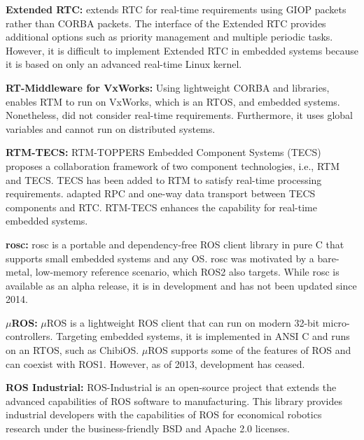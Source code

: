 \documentclass{sig-alternate-05-2015}
\begin{document}
\textbf{Extended RTC:} 
\cite{chishiro2009extended} extends RTC for real-time requirements using GIOP packets rather than CORBA packets.
The interface of the Extended RTC provides additional options such as priority management and multiple periodic tasks. 
However, it is difficult to implement Extended RTC in embedded systems because it is based on only an advanced real-time Linux kernel.

\textbf{RT-Middleware for VxWorks:} 
Using lightweight CORBA and libraries, \cite{ikezoeopenrt} enables RTM to run on VxWorks, which is an RTOS, and embedded systems.
Nonetheless,  \cite{ikezoeopenrt} did not consider real-time requirements. 
Furthermore, it uses global variables and cannot run on distributed systems.

\textbf{RTM-TECS:} RTM-TOPPERS Embedded Component Systems (TECS) \cite{rtmtecs2016} proposes a collaboration framework of two component technologies, i.e., RTM and TECS. 
TECS \cite{azumi2015mruby} has been added to RTM to satisfy real-time processing requirements. 
\cite{rtmtecs2016} adapted RPC and one-way data transport between TECS components and RTC. 
RTM-TECS enhances the capability for real-time embedded systems.

\textbf{rosc:} 
rosc \cite{rosc@roscon2013} is a portable and dependency-free ROS client library in pure C that supports small embedded systems and any OS. rosc was motivated by a bare-metal, low-memory reference scenario, which ROS2 also targets. While rosc is available as an alpha release, it is in development and has not been updated since 2014.

\textbf{\(\mu\)ROS:} 
\(\mu\)ROS \cite{uros@roscon2013} is a lightweight ROS client that can run on modern 32-bit micro-controllers.
Targeting embedded systems, it is implemented in ANSI C and runs on an RTOS, such as ChibiOS. 
\(\mu\)ROS supports some of the features of ROS and can coexist with ROS1. 
However, as of 2013, development has ceased.

\textbf{ROS Industrial:} 
ROS-Industrial \cite{rosindustrial} is an open-source project that extends the advanced capabilities of ROS software to manufacturing. 
This library provides industrial developers with the capabilities of ROS for economical robotics research under the business-friendly BSD and Apache 2.0 licenses. 

\end{document}
